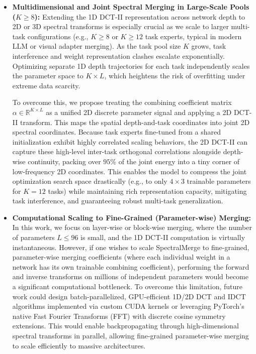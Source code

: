 \begin{itemize}
    \item \textbf{Multidimensional and Joint Spectral Merging in Large-Scale Pools ($K \ge 8$):} Extending the 1D DCT-II representation across network depth to 2D or 3D spectral transforms is especially crucial as we scale to larger multi-task configurations (e.g., $K \ge 8$ or $K \ge 12$ task experts, typical in modern LLM or visual adapter merging). As the task pool size $K$ grows, task interference and weight representation clashes escalate exponentially. Optimizing separate 1D depth trajectories for each task independently scales the parameter space to $K \times L$, which heightens the risk of overfitting under extreme data scarcity. 
    
    To overcome this, we propose treating the combining coefficient matrix $\alpha \in \mathbb{R}^{K \times L}$ as a unified 2D discrete parameter signal and applying a 2D DCT-II transform. This maps the spatial depth-and-task coordinates into joint 2D spectral coordinates. Because task experts fine-tuned from a shared initialization exhibit highly correlated scaling behaviors, the 2D DCT-II can capture these high-level inter-task orthogonal correlations alongside depth-wise continuity, packing over $95\%$ of the joint energy into a tiny corner of low-frequency 2D coordinates. This enables the model to compress the joint optimization search space drastically (e.g., to only $4 \times 3$ trainable parameters for $K=12$ tasks) while maintaining rich representation capacity, mitigating task interference, and guaranteeing robust multi-task generalization.
    \item \textbf{Computational Scaling to Fine-Grained (Parameter-wise) Merging:} In this work, we focus on layer-wise or block-wise merging, where the number of parameters $L \le 96$ is small, and the 1D DCT-II computation is virtually instantaneous. However, if one wishes to scale SpectralMerge to fine-grained, parameter-wise merging coefficients (where each individual weight in a network has its own trainable combining coefficient), performing the forward and inverse transforms on millions of independent parameters would become a significant computational bottleneck. To overcome this limitation, future work could design batch-parallelized, GPU-efficient 1D/2D DCT and IDCT algorithms implemented via custom CUDA kernels or leveraging PyTorch's native Fast Fourier Transforms (FFT) with discrete cosine symmetry extensions. This would enable backpropagating through high-dimensional spectral transforms in parallel, allowing fine-grained parameter-wise merging to scale efficiently to massive architectures. 


\end{itemize}
